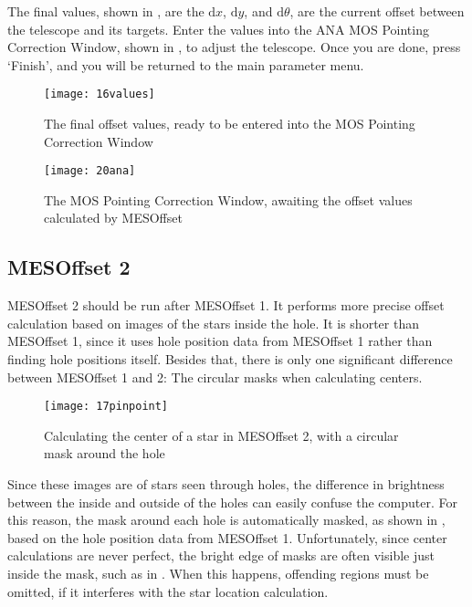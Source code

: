 \documentclass[10pt]{article}
\begin{document}
The final values, shown in , are the $\mathrm{d}x$, $\mathrm{d}y$, and $\mathrm{d}\theta$, are the current offset between the telescope and its targets. Enter the values into the ANA MOS Pointing Correction Window, shown in , to adjust the telescope. Once you are done, press \lq Finish\rq, and you will be returned to the main parameter menu.

\begin{figure}[!ht]
	\centering
	\texttt{[image: 16values]}
	\caption{The final offset values, ready to be entered into the MOS Pointing Correction Window}
 	\label{fig:values}
\end{figure}

\begin{figure}[!ht]
	\centering
	\texttt{[image: 20ana]}
	\caption{The MOS Pointing Correction Window, awaiting the offset values calculated by MESOffset}
 	\label{fig:ana}
\end{figure}

\subsection{MESOffset 2}

MESOffset 2 should be run after MESOffset 1. It performs more precise offset calculation based on images of the stars inside the hole. It is shorter than MESOffset 1, since it uses hole position data from MESOffset 1 rather than finding hole positions itself. Besides that, there is only one significant difference between MESOffset 1 and 2: The circular masks when calculating centers.

\begin{figure}
    \centering
    \texttt{[image: 17pinpoint]}
    \caption{Calculating the center of a star in MESOffset 2, with a circular mask around the hole}
    \label{fig:pinpoint}
\end{figure}

Since these images are of stars seen through holes, the difference in brightness between the inside and outside of the holes can easily confuse the computer. For this reason, the mask around each hole is automatically masked, as shown in , based on the hole position data from MESOffset 1. Unfortunately, since center calculations are never perfect, the bright edge of masks are often visible just inside the mask, such as in . When this happens, offending regions must be omitted, if it interferes with the star location calculation.
\end{document}
